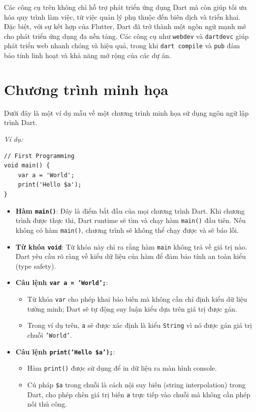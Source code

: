 \documentclass[../DoAn.tex]{subfiles}
\numberwithin{figure}{chapter}
\begin{document}
Các công cụ trên không chỉ hỗ trợ phát triển ứng dụng Dart mà còn giúp tối ưu hóa quy trình làm việc, từ việc quản lý phụ thuộc đến biên dịch và triển khai. Đặc biệt, với sự kết hợp của Flutter, Dart đã trở thành một ngôn ngữ mạnh mẽ cho phát triển ứng dụng đa nền tảng. Các công cụ như \texttt{webdev} và \texttt{dartdevc} giúp phát triển web nhanh chóng và hiệu quả, trong khi \texttt{dart compile} và \texttt{pub} đảm bảo tính linh hoạt và khả năng mở rộng của các dự án.

\section{Chương trình minh họa}
Dưới đây là một ví dụ mẫu về một chương trình minh họa sử dụng ngôn ngữ lập trình Dart.

\textit{Ví dụ:}
\begin{lstlisting}
// First Programming
void main() {
    var a = 'World';
    print('Hello $a');
} 
\end{lstlisting}

\begin{itemize}
    \item \textbf{Hàm \texttt{main()}}: Đây là điểm bắt đầu của mọi chương trình Dart. Khi chương trình được thực thi, Dart runtime sẽ tìm và chạy hàm \texttt{main()} đầu tiên. Nếu không có hàm \texttt{main()}, chương trình sẽ không thể chạy được và sẽ báo lỗi.
    
    \item \textbf{Từ khóa \texttt{void}}: Từ khóa này chỉ ra rằng hàm \texttt{main} không trả về giá trị nào. Dart yêu cầu rõ ràng về kiểu dữ liệu của hàm để đảm bảo tính an toàn kiểu (type safety).
    
    \item \textbf{Câu lệnh \texttt{var a = 'World';}}: 
    \begin{itemize}
        \item Từ khóa \texttt{var} cho phép khai báo biến mà không cần chỉ định kiểu dữ liệu tường minh; Dart sẽ tự động suy luận kiểu dựa trên giá trị được gán.
        \item Trong ví dụ trên, \texttt{a} sẽ được xác định là kiểu \texttt{String} vì nó được gán giá trị chuỗi \texttt{'World'}.
    \end{itemize}
    
    \item \textbf{Câu lệnh \texttt{print('Hello \$a');}}:
    \begin{itemize}
        \item Hàm \texttt{print()} được sử dụng để in dữ liệu ra màn hình console.
        \item Cú pháp \texttt{\$a} trong chuỗi là cách nội suy biến (string interpolation) trong Dart, cho phép chèn giá trị biến \texttt{a} trực tiếp vào chuỗi mà không cần phép nối thủ công.
    \end{itemize}
\end{itemize}
\end{document}
